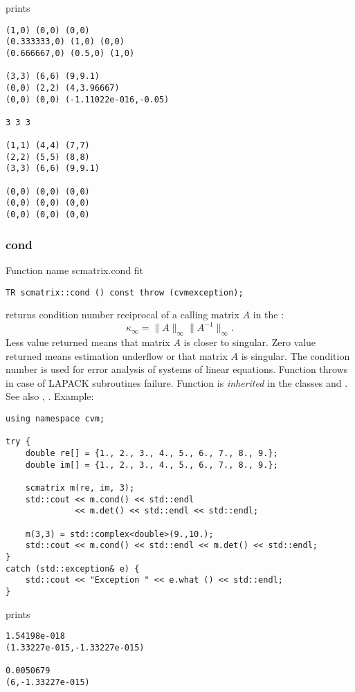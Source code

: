 prints
\begin{Verbatim}
(1,0) (0,0) (0,0)
(0.333333,0) (1,0) (0,0)
(0.666667,0) (0.5,0) (1,0)

(3,3) (6,6) (9,9.1)
(0,0) (2,2) (4,3.96667)
(0,0) (0,0) (-1.11022e-016,-0.05)

3 3 3

(1,1) (4,4) (7,7)
(2,2) (5,5) (8,8)
(3,3) (6,6) (9,9.1)

(0,0) (0,0) (0,0)
(0,0) (0,0) (0,0)
(0,0) (0,0) (0,0)
\end{Verbatim}
\newpage




\subsubsection{cond}
Function%
\pdfdest name {scmatrix.cond} fit
\begin{verbatim}
TR scmatrix::cond () const throw (cvmexception);
\end{verbatim}
returns  condition number reciprocal of 
a calling matrix $A$ in the :
\begin{equation*}
\kappa_\infty=\|A\|_\infty \|A^{-1}\|_\infty.
\end{equation*}
Less value returned means that matrix $A$ is closer to singular.
Zero value returned means estimation underflow or
that matrix $A$ is singular.
The condition number is used for error analysis
of systems of linear equations.
Function throws  in case of LAPACK
subroutines failure.
Function is \emph{inherited} in the classes
and .
See also
, .
Example:
\begin{Verbatim}
using namespace cvm;

try {
    double re[] = {1., 2., 3., 4., 5., 6., 7., 8., 9.};
    double im[] = {1., 2., 3., 4., 5., 6., 7., 8., 9.};

    scmatrix m(re, im, 3);
    std::cout << m.cond() << std::endl 
              << m.det() << std::endl << std::endl;

    m(3,3) = std::complex<double>(9.,10.);
    std::cout << m.cond() << std::endl << m.det() << std::endl;
}
catch (std::exception& e) {
    std::cout << "Exception " << e.what () << std::endl;
}
\end{Verbatim}
prints
\begin{Verbatim}
1.54198e-018
(1.33227e-015,-1.33227e-015)

0.0050679
(6,-1.33227e-015)
\end{Verbatim}
\newpage




